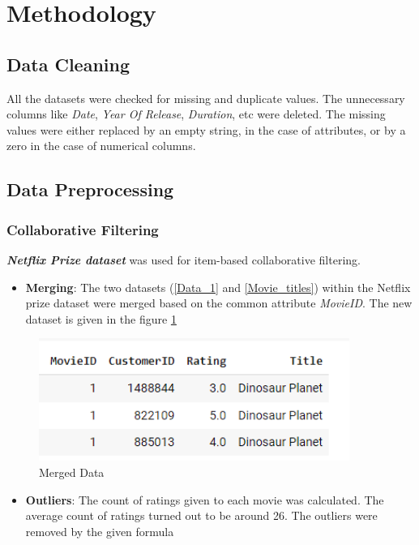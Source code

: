 \documentclass[a4paper,10pt]{article}
\begin{document}
\section{Methodology}

\subsection{Data Cleaning}

All the datasets were checked for missing and duplicate values. 
The unnecessary columns like \textit{Date}, \textit{Year Of Release}, \textit{Duration}, etc were deleted. The missing values were either replaced by an empty string, in the case of attributes, or by a zero in the case of numerical columns.  


\subsection{Data Preprocessing}

\subsubsection{Collaborative Filtering}
\textit{\textbf{Netflix Prize dataset}} was used for item-based collaborative filtering. 
\begin{itemize}
    \item \textbf{Merging}: The two datasets (\ref{Data_1} and \ref{Movie_titles}) within the Netflix prize dataset were merged based on the common attribute \textit{MovieID}. The new dataset is given in the figure \ref{Movie_merge}
\end{itemize}

\begin{figure}[ht]
\centering
\includegraphics[height=4cm]{figures/movie_data.png}
\caption{Merged Data}
\label{Movie_merge}
\end{figure}


\begin{itemize}
    \item \textbf{Outliers}: The count of ratings given to each movie was calculated. The average count of ratings turned out to be around 26. The outliers were removed by the given formula 
\end{itemize}
\end{document}
